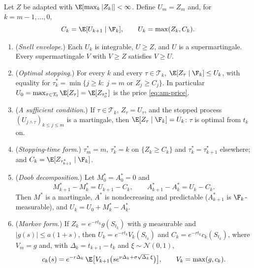 \begin{theorem}\label{thm:am-dp}
Let $Z$ be adapted with $\E[\max_k|Z_k|]<\infty$. Define $U_m=Z_m$ and, for
$k=m-1,\dots,0$,
\begin{equation}\label{eq:am-dp}
  C_k=\E[U_{k+1}\mid\F_k],\qquad U_k=\max(Z_k,C_k).
\end{equation}
\begin{enumerate}[label=(\roman*)]
  \item (\emph{Snell envelope}.) Each $U_k$ is integrable, $U\ge Z$, and $U$ is a
    supermartingale. Every supermartingale $V$ with $V\ge Z$ satisfies $V\ge U$.
  \item (\emph{Optimal stopping}.) For every $k$ and every $\tau\in\mathcal T_k$,
    $\E[Z_\tau\mid\F_k]\le U_k$, with equality for
    $\tau^*_k=\min\{j\ge k:\ j=m\text{ or }Z_j\ge C_j\}$. In particular
    $U_0=\max_{\tau\in\mathcal T_0}\E[Z_\tau]=\E[Z_{\tau^*_0}]$ is the price \eqref{eq:am-price}.
  \item (\emph{A sufficient condition}.) If $\tau\in\mathcal T_k$, $Z_\tau=U_\tau$, and the
    stopped process $(U_{j\wedge\tau})_{k\le j\le m}$ is a martingale, then
    $\E[Z_\tau\mid\F_k]=U_k$: $\tau$ is optimal from $t_k$ on.
  \item (\emph{Stopping-time form}.) $\tau^*_m=m$, $\tau^*_k=k$ on $\{Z_k\ge C_k\}$ and
    $\tau^*_k=\tau^*_{k+1}$ elsewhere; and $C_k=\E[Z_{\tau^*_{k+1}}\mid\F_k]$.
  \item (\emph{Doob decomposition}.) Let $M^*_0=A^*_0=0$ and
    \begin{equation}\label{eq:am-doob}
      M^*_{k+1}-M^*_k=U_{k+1}-C_k,\qquad A^*_{k+1}-A^*_k=U_k-C_k .
    \end{equation}
    Then $M^*$ is a martingale, $A^*$ is nondecreasing and predictable ($A^*_{k+1}$ is
    $\F_k$-measurable), and $U_k=U_0+M^*_k-A^*_k$.
  \item (\emph{Markov form}.) If $Z_k=e^{-rt_k}g(S_{t_k})$ with $g$ measurable and
    $|g(s)|\le a(1+s)$, then $U_k=e^{-rt_k}V_k(S_{t_k})$ and $C_k=e^{-rt_k}c_k(S_{t_k})$,
    where $V_m=g$ and, with $\Delta_k=t_{k+1}-t_k$ and $\xi\sim\mathcal N(0,1)$,
    \begin{equation}\label{eq:am-markov}
      c_k(s)=e^{-r\Delta_k}\,\E\big[V_{k+1}\big(se^{\nu\Delta_k+\sigma\sqrt{\Delta_k}\,\xi}\big)\big],
      \qquad V_k=\max(g,c_k).
    \end{equation}
\end{enumerate}
\end{theorem}

